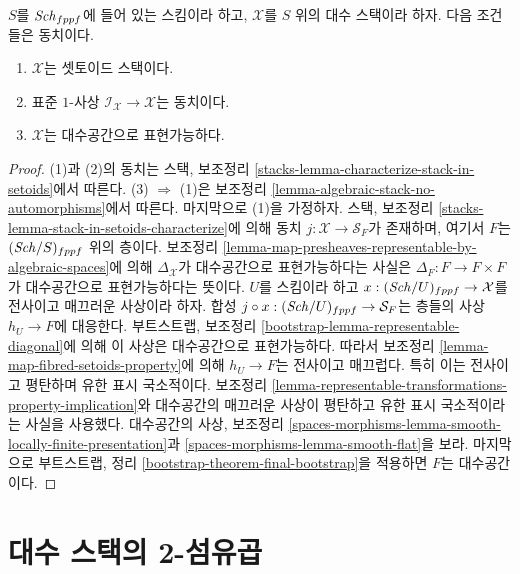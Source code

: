 \begin{proposition}
\label{proposition-algebraic-stack-no-automorphisms}
$S$를 $\mathit{Sch}_{fppf}$에 들어 있는 스킴이라 하고, $\mathcal{X}$를
$S$ 위의 대수 스택이라 하자. 다음 조건들은 동치이다.
\begin{enumerate}
\item $\mathcal{X}$는 셋토이드 스택이다.
\item 표준 $1$-사상 $\mathcal{I}_\mathcal{X} \to \mathcal{X}$는
동치이다.
\item $\mathcal{X}$는 대수공간으로 표현가능하다.
\end{enumerate}
\end{proposition}

\begin{proof}
(1)과 (2)의 동치는 스택, 보조정리
\ref{stacks-lemma-characterize-stack-in-setoids}에서 따른다.
(3) $\Rightarrow$ (1)은 보조정리
\ref{lemma-algebraic-stack-no-automorphisms}에서 따른다. 마지막으로 (1)을
가정하자. 스택, 보조정리
\ref{stacks-lemma-stack-in-setoids-characterize}에 의해 동치
$j : \mathcal{X} \to \mathcal{S}_F$가 존재하며, 여기서 $F$는
$(\mathit{Sch}/S)_{fppf}$ 위의 층이다. 보조정리
\ref{lemma-map-presheaves-representable-by-algebraic-spaces}에 의해
$\Delta_\mathcal{X}$가 대수공간으로 표현가능하다는 사실은
$\Delta_F : F \to F \times F$가 대수공간으로 표현가능하다는 뜻이다.
$U$를 스킴이라 하고 $x : (\mathit{Sch}/U)_{fppf} \to \mathcal{X}$를 전사이고
매끄러운 사상이라 하자. 합성
$j \circ x : (\mathit{Sch}/U)_{fppf} \to \mathcal{S}_F$는 층들의 사상
$h_U \to F$에 대응한다. 부트스트랩, 보조정리
\ref{bootstrap-lemma-representable-diagonal}에 의해 이 사상은
대수공간으로 표현가능하다. 따라서 보조정리
\ref{lemma-map-fibred-setoids-property}에 의해 $h_U \to F$는 전사이고
매끄럽다. 특히 이는 전사이고 평탄하며 유한 표시 국소적이다. 보조정리
\ref{lemma-representable-transformations-property-implication}와
대수공간의 매끄러운 사상이 평탄하고 유한 표시 국소적이라는 사실을
사용했다. 대수공간의 사상, 보조정리
\ref{spaces-morphisms-lemma-smooth-locally-finite-presentation}과
\ref{spaces-morphisms-lemma-smooth-flat}을 보라. 마지막으로 부트스트랩,
정리 \ref{bootstrap-theorem-final-bootstrap}을 적용하면 $F$는
대수공간이다.
\end{proof}






\section{대수 스택의 2-섬유곱}
\label{section-2-fibre-products}


